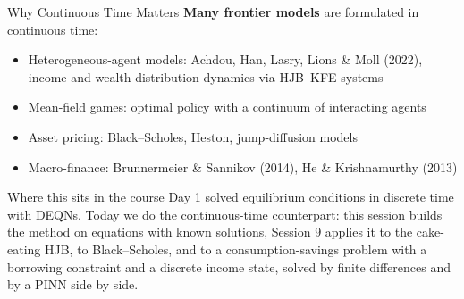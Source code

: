 \documentclass[aspectratio=169,11pt]{beamer}
\newcommand{\emphc}[1]{\textcolor{harvardcrimson}{#1}}
\begin{document}
\begin{frame}{Why Continuous Time Matters}
\textbf{Many frontier models} are formulated in continuous time:

\vspace{0.3em}
\begin{itemize}
    \item \emphc{Heterogeneous-agent models:} Achdou, Han, Lasry, Lions \& Moll (2022), income and wealth distribution dynamics via HJB--KFE systems

    \vspace{0.2em}
    \item \emphc{Mean-field games:} optimal policy with a continuum of interacting agents

    \vspace{0.2em}
    \item \emphc{Asset pricing:} Black--Scholes, Heston, jump-diffusion models

    \vspace{0.2em}
    \item \emphc{Macro-finance:} Brunnermeier \& Sannikov (2014), He \& Krishnamurthy (2013)
\end{itemize}

\vspace{0.4em}
\begin{block}{Where this sits in the course}
Day 1 solved equilibrium conditions in \emphc{discrete} time with DEQNs. Today we do the \emphc{continuous-time} counterpart: this session builds the method on equations with known solutions, Session 9 applies it to the cake-eating HJB, to Black--Scholes, and to a consumption-savings problem with a borrowing constraint and a discrete income state, solved by finite differences and by a PINN side by side.
\end{block}
\end{frame}
\end{document}
